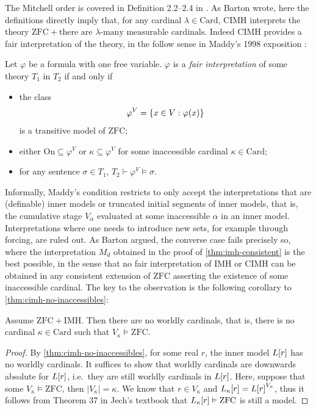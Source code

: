 \documentclass[12pt]{article}
\theoremstyle{plain}
\theoremstyle{definition}
\newcommand{\ZFC}{\mathrm{ZFC}}
\newcommand{\On}{\mathrm{On}}
\newcommand{\Card}{\mathrm{Card}}
\newcommand{\IMH}{\mathrm{IMH}}
\newcommand{\CIMH}{\mathrm{CIMH}}
\begin{document}
The Mitchell order is covered in Definition 2.2--2.4 in \cite{mitchell-inner-model-theory}. As Barton wrote, here the definitions directly imply that, for any cardinal $\lambda \in \Card$, $\CIMH$ interprets the theory $\ZFC + \text{there are $\lambda$-many measurable cardinals}$. Indeed $\CIMH$ provides a fair interpretation of the theory, in the follow sense in Maddy's 1998 exposition \cite{maddy-maximize}:

\begin{definition}
	Let $\varphi$ be a formula with one free variable. $\varphi$ is a \emph{fair interpretation} of some theory $T_1$ in $T_2$ if and only if
	\begin{itemize}
		\item the class
		      \[\varphi^V = \left\{x \in V : \varphi\mleft(x\mright)\right\}\]
		      is a transitive model of $\ZFC$;
		\item either $\On \subseteq \varphi^V$ or $\kappa \subseteq \varphi^V$ for some inaccessible cardinal $\kappa \in \Card$;
		\item for any sentence $\sigma \in T_1$, $T_2 \vdash \varphi^V \vDash \sigma$.
	\end{itemize}
\end{definition}

Informally, Maddy's condition restricts to only accept the interpretations that are (definable) inner models or truncated initial segments of inner models, that is, the cumulative stage $V_\alpha$ evaluated at some inaccessible $\alpha$ in an inner model. Interpretations where one needs to introduce new sets, for example through forcing, are ruled out. As Barton argued, the converse case fails precisely so, where the interpretation $M_d$ obtained in the proof of \autoref{thm:imh-consistent} is the best possible, in the sense that no fair interpretation of $\IMH$ or $\CIMH$ can be obtained in any consistent extension of $\ZFC$ asserting the existence of some inaccessible cardinal. The key to the observation is the following corollary to \autoref{thm:cimh-no-inaccessibles}:

\begin{corollary}
	Assume $\ZFC + \IMH$. Then there are no worldly cardinals, that is, there is no cardinal $\kappa \in \Card$ such that $V_\kappa \vDash \ZFC$.
\end{corollary}

\begin{proof}
	By \autoref{thm:cimh-no-inaccessibles}, for some real $r$, the inner model $L\mleft[r\mright]$ has no worldly cardinals. It suffices to show that worldly cardinals are downwards absolute for $L\mleft[r\mright]$, i.e.\ they are still worldly cardinals in $L\mleft[r\mright]$. Here, suppose that some $V_\kappa \vDash \ZFC$, then $\left|V_\kappa\right| = \kappa$. We know that $r \in V_\kappa$ and $L_\kappa\mleft[r\mright] = L\mleft[r\mright]^{V_\kappa}$, thus it follows from Theorem 37 in Jech's textbook \cite{jech-set-theory} that $L_\kappa\mleft[r\mright] \vDash \ZFC$ is still a model.
\end{proof}
\end{document}
